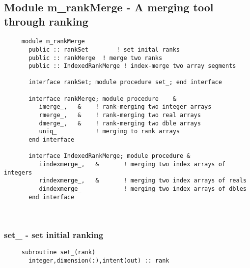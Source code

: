 \mbox{}\hrulefill\ 

  \subsection{Module m\_rankMerge - A merging tool through ranking }

\begin{verbatim} 
     module m_rankMerge
       public :: rankSet		! set inital ranks
       public :: rankMerge	! merge two ranks
       public :: IndexedRankMerge ! index-merge two array segments
 
       interface rankSet; module procedure set_; end interface
 
       interface rankMerge; module procedure	&
          imerge_,   &    ! rank-merging two integer arrays
          rmerge_,   &    ! rank-merging two real arrays
          dmerge_,   &    ! rank-merging two dble arrays
          uniq_	          ! merging to rank arrays
       end interface
 
       interface IndexedRankMerge; module procedure	&
          iindexmerge_,   &       ! merging two index arrays of integers
          rindexmerge_,   &       ! merging two index arrays of reals
          dindexmerge_            ! merging two index arrays of dbles
       end interface
 \end{verbatim}%
 
 
\mbox{}\hrulefill\ 
 
  \subsubsection{set\_ - set initial ranking}

\begin{verbatim} 
     subroutine set_(rank)
       integer,dimension(:),intent(out) :: rank
 \end{verbatim}%
 
 
